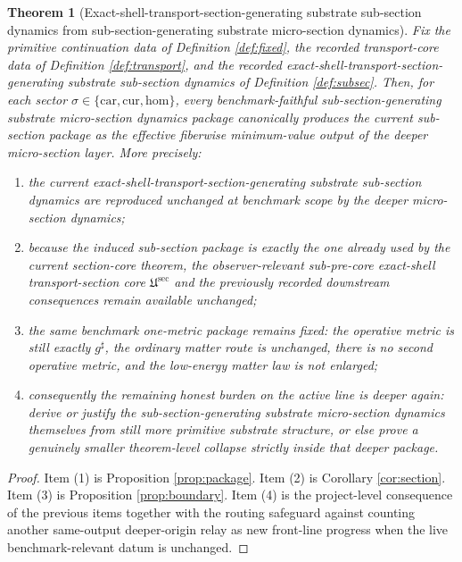 \documentclass[11pt]{article}
\newcommand{\CompletedMetric}{g^{\sharp}}
\newcommand{\Car}{\mathrm{car}}
\newcommand{\Cur}{\mathrm{cur}}
\newcommand{\Hom}{\mathrm{hom}}
\newcommand{\SubPreSectionCore}{\mathfrak U^{\mathrm{sec}}}
\newtheorem{theorem}{Theorem}
\begin{document}
\begin{theorem}[Exact-shell-transport-section-generating substrate sub-section dynamics from sub-section-generating substrate micro-section dynamics]
\label{thm:main}
Fix the primitive continuation data of Definition \ref{def:fixed}, the recorded transport-core data of Definition \ref{def:transport}, and the recorded exact-shell-transport-section-generating substrate sub-section dynamics of Definition \ref{def:subsec}. Then, for each sector \(\sigma\in\{\Car,\Cur,\Hom\}\), every benchmark-faithful sub-section-generating substrate micro-section dynamics package canonically produces the current sub-section package as the effective fiberwise minimum-value output of the deeper micro-section layer. More precisely:
\begin{enumerate}
    \item the current exact-shell-transport-section-generating substrate sub-section dynamics are reproduced unchanged at benchmark scope by the deeper micro-section dynamics;
    \item because the induced sub-section package is exactly the one already used by the current section-core theorem, the observer-relevant sub-pre-core exact-shell transport-section core \(\SubPreSectionCore\) and the previously recorded downstream consequences remain available unchanged;
    \item the same benchmark one-metric package remains fixed: the operative metric is still exactly \(\CompletedMetric\), the ordinary matter route is unchanged, there is no second operative metric, and the low-energy matter law is not enlarged;
    \item consequently the remaining honest burden on the active line is deeper again: derive or justify the sub-section-generating substrate micro-section dynamics themselves from still more primitive substrate structure, or else prove a genuinely smaller theorem-level collapse strictly inside that deeper package.
\end{enumerate}
\end{theorem}

\begin{proof}
Item (1) is Proposition \ref{prop:package}. Item (2) is Corollary \ref{cor:section}. Item (3) is Proposition \ref{prop:boundary}. Item (4) is the project-level consequence of the previous items together with the routing safeguard against counting another same-output deeper-origin relay as new front-line progress when the live benchmark-relevant datum is unchanged.
\end{proof}
\end{document}
